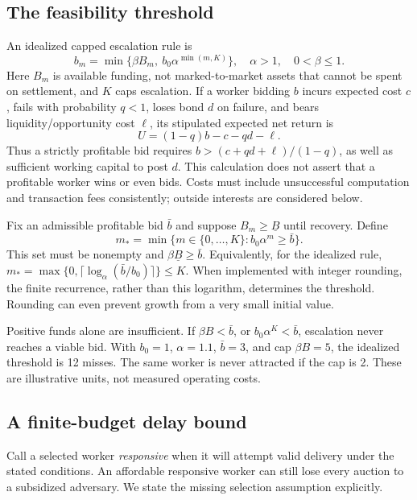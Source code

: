 \documentclass[10pt,letterpaper]{article}
\begin{document}
\subsection{The feasibility threshold}
An idealized capped escalation rule is
\begin{equation}
 b_m=\min\{\beta B_m,\ b_0\alpha^{\min(m,K)}\},
 \quad \alpha>1,\quad 0<\beta\leq1. \label{eq:bounty}
\end{equation}
Here $B_m$ is available funding, not marked-to-market assets that cannot be spent on settlement, and $K$ caps escalation. If a worker bidding $b$ incurs expected cost $c$, fails with probability $q<1$, loses bond $d$ on failure, and bears liquidity/opportunity cost $\ell$, its stipulated expected net return is
\begin{equation}
 U=(1-q)b-c-qd-\ell.
 \label{eq:utility}
\end{equation}
Thus a strictly profitable bid requires $b>(c+qd+\ell)/(1-q)$, as well as sufficient working capital to post $d$. This calculation does not assert that a profitable worker wins or even bids. Costs must include unsuccessful computation and transaction fees consistently; outside interests are considered below.

Fix an admissible profitable bid $\bar b$ and suppose $B_m\geq\underline B$ until recovery. Define
\begin{equation}
 m_* = \min\{m\in\{0,\ldots,K\}: b_0\alpha^m\geq\bar b\}.
 \label{eq:threshold}
\end{equation}
This set must be nonempty and $\beta\underline B\geq\bar b$. Equivalently, for the idealized rule, $m_*=\max\{0,\lceil\log_\alpha(\bar b/b_0)\rceil\}\leq K$. When implemented with integer rounding, the finite recurrence, rather than this logarithm, determines the threshold. Rounding can even prevent growth from a very small initial value.

Positive funds alone are insufficient. If $\beta B<\bar b$, or $b_0\alpha^K<\bar b$, escalation never reaches a viable bid. With $b_0=1$, $\alpha=1.1$, $\bar b=3$, and cap $\beta B=5$, the idealized threshold is 12 misses. The same worker is never attracted if the cap is 2. These are illustrative units, not measured operating costs.

\subsection{A finite-budget delay bound}
Call a selected worker \emph{responsive} when it will attempt valid delivery under the stated conditions. An affordable responsive worker can still lose every auction to a subsidized adversary. We state the missing selection assumption explicitly.
\end{document}

